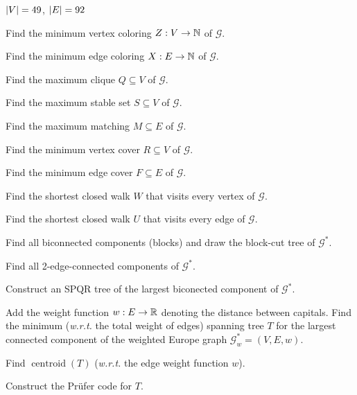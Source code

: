 \documentclass[a4paper,12pt]{article}
\newcommand{\graph}[1][G]{\mathcal{#1}}
\newcommand{\op}[1]{\operatorname*{#1}}
\newcommand{\graphCentroid}[1]{\op{centroid}(#1)}
\begin{document}
\begin{tasks}
\begin{subtasks}
        $\left|V\right| = 49$, $\left|E\right| = 92$
        \item Find the minimum vertex coloring $Z: V \to \mathbb{N}$ of $\graph$.
        
        \item Find the minimum edge coloring $X: E \to \mathbb{N}$ of $\graph$.
        
        \item Find the maximum clique $Q \subseteq V$ of $\graph$.

        \item Find the maximum stable set $S \subseteq V$ of $\graph$.
        
        \item Find the maximum matching $M \subseteq E$ of $\graph$.
        
        \item Find the minimum vertex cover $R \subseteq V$ of $\graph$.
        
        \item Find the minimum edge cover $F \subseteq E$ of $\graph$.
        
        \item Find the shortest closed walk $W$ that visits every vertex of $\graph$.
        
        \item Find the shortest closed walk $U$ that visits every edge of $\graph$.
        
        \item Find all biconnected components (blocks) and draw the block-cut tree of $\graph^{*}$.
        
        \item Find all 2-edge-connected components of $\graph^{*}$.
        
        \item Construct an SPQR tree of the largest biconected component of $\graph^{*}$.
        
        \item Add the weight function $w: E \to \mathbb{R}$ denoting the distance between capitals. Find the minimum (\textit{w.r.t.} the total weight of edges) spanning tree $T$ for the largest connected component of the weighted Europe graph $\graph^{*}_{w} = (V, E, w)$.
        
        \item Find $\graphCentroid{T}$ (\textit{w.r.t.} the edge weight function $w$).
        
        \item Construct the Prüfer code for $T$.
    \end{subtasks}


\end{tasks}
\end{document}
